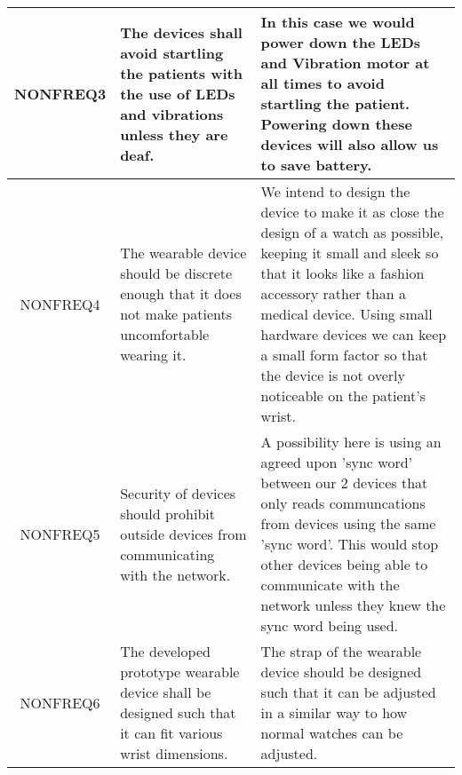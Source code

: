 \begin{xltabular}[H]{\textwidth}{c | X | X}
        \midrule

        NONFREQ3

        &

        The devices shall avoid startling the patients with the use of LEDs and vibrations unless they are deaf.

        &

        In this case we would power down the LEDs and Vibration motor at all times to avoid startling the patient. Powering down these devices will also allow us to save battery.\\

        \midrule

        NONFREQ4

        &

        The wearable device should be discrete enough that it does not make patients uncomfortable wearing it.

        &

        We intend to design the device to make it as close the design of a watch as possible, keeping it small and sleek so that it looks like a fashion accessory rather than a medical device. Using small hardware devices we can keep a small form factor so that the device is not overly noticeable on the patient's wrist.\\

        \midrule

        NONFREQ5

        &

        Security of devices should prohibit outside devices from communicating with the network.

        &

        A possibility here is using an agreed upon 'sync word' between our 2 devices that only reads communcations from devices using the same 'sync word'. This would stop other devices being able to communicate with the network unless they knew the sync word being used.\\

		\midrule

        NONFREQ6

        &

        The developed prototype wearable device shall be designed such that it can fit various wrist dimensions.

        &

        The strap of the wearable device should be designed such that it can be adjusted in a similar way to how normal watches can be adjusted.\\


\end{xltabular}
